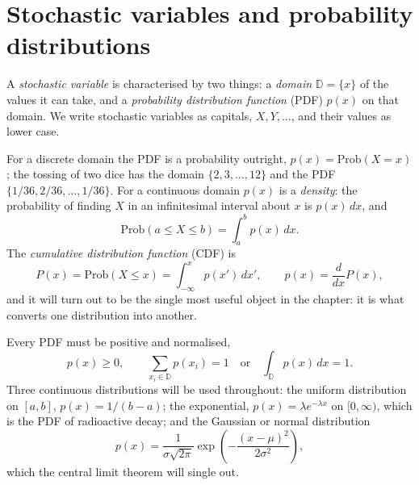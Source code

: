\section{Stochastic variables and probability distributions}
\label{sec:pdfs}

A \emph{stochastic variable} is characterised by two things: a \emph{domain}
$\mathbb{D}=\{x\}$ of the values it can take, and a \emph{probability
distribution function} (PDF) $p(x)$ on that domain.  We write stochastic
variables as capitals, $X,Y,\dots$, and their values as lower case.

For a discrete domain the PDF is a probability outright,
$p(x)=\mathrm{Prob}(X=x)$; the tossing of two dice has the domain
$\{2,3,\dots,12\}$ and the PDF $\{1/36,2/36,\dots,1/36\}$.  For a continuous
domain $p(x)$ is a \emph{density}: the probability of finding $X$ in an
infinitesimal interval about $x$ is $p(x)\,dx$, and
\begin{equation}
  \mathrm{Prob}(a\le X\le b) = \int_a^b p(x)\,dx .
  \label{eq:12-probinterval}
\end{equation}
The \emph{cumulative distribution function} (CDF) is
\begin{equation}
  P(x) = \mathrm{Prob}(X\le x) = \int_{-\infty}^{x}p(x')\,dx',
  \qquad p(x) = \frac{d}{dx}P(x),
  \label{eq:12-cdf}
\end{equation}
and it will turn out to be the single most useful object in the chapter: it is
what converts one distribution into another.

Every PDF must be positive and normalised,
\begin{equation}
  p(x)\ge0,
  \qquad
  \sum_{x_i\in\mathbb{D}}p(x_i) = 1
  \quad\text{or}\quad
  \int_{\mathbb{D}}p(x)\,dx = 1 .
  \label{eq:12-normalisation}
\end{equation}
Three continuous distributions will be used throughout: the uniform
distribution on $[a,b]$, $p(x)=1/(b-a)$; the exponential,
$p(x)=\lambda e^{-\lambda x}$ on $[0,\infty)$, which is the PDF of
radioactive decay; and the Gaussian or normal distribution
\begin{equation}
  p(x) = \frac{1}{\sigma\sqrt{2\pi}}
    \exp\left(-\frac{(x-\mu)^2}{2\sigma^2}\right),
  \label{eq:12-gaussian}
\end{equation}
which the central limit theorem will single out.

